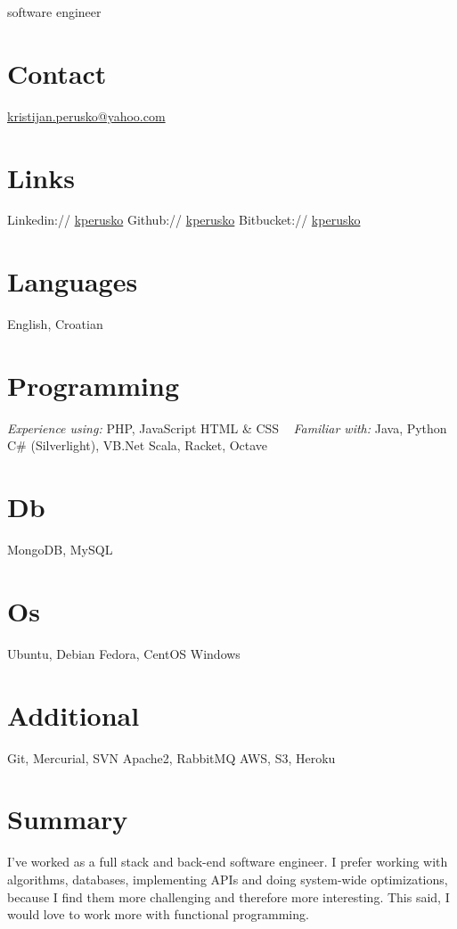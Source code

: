 \documentclass[]{cv}
\begin{document}
       {software engineer}


\begin{aside}
  \section{Contact}
    \href{mailto:kristijan.perusko@yahoo.com}{kristijan.perusko@yahoo.com}
  \section{Links}  
    Linkedin://  \href{https://www.linkedin.com/in/kperusko}{kperusko}
    Github:// \href{https://github.com/kperusko}{kperusko}
    Bitbucket:// \href{https://bitbucket.org/kperusko}{kperusko}
  \section{Languages}
    English, Croatian
  \section{Programming}
    \emph{Experience using:}
    PHP, JavaScript
    HTML \& CSS
~     
    \emph{Familiar with:}
    Java, Python
    C\# (Silverlight), VB.Net
    Scala, Racket, Octave
  \section{Db}
    MongoDB, MySQL
  \section{Os}
    Ubuntu, Debian 
    Fedora, CentOS
    Windows
  \section{Additional}
    Git, Mercurial, SVN
    Apache2, RabbitMQ
    AWS, S3, Heroku
\end{aside}

\section{Summary}
I've worked as a full stack and back-end software engineer. I prefer working with algorithms, databases, implementing APIs and doing system-wide optimizations, because I find them more challenging and therefore more interesting. This said, I would love to work more with functional programming.
\end{document}

